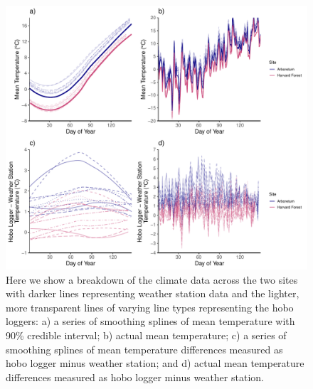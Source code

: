 \documentclass{article}\usepackage[]{graphicx}\usepackage[]{color}
\begin{document}
{\begin{figure} [H]
  \begin{center}
  \includegraphics[width=16cm]{..//analyses/figures/clim_4panel.pdf}
  \caption{Here we show a breakdown of the climate data across the two sites with darker lines representing weather station data and the lighter, more transparent lines of varying line types representing the hobo loggers: a) a series of smoothing splines of mean temperature with 90\% credible interval; b) actual mean temperature; c) a series of smoothing splines of mean temperature differences measured as hobo logger minus weather station; and d) actual mean temperature differences measured as hobo logger minus weather station.}\label{fig:clim}
  \end{center}
  \end{figure}}
  
\end{document}
